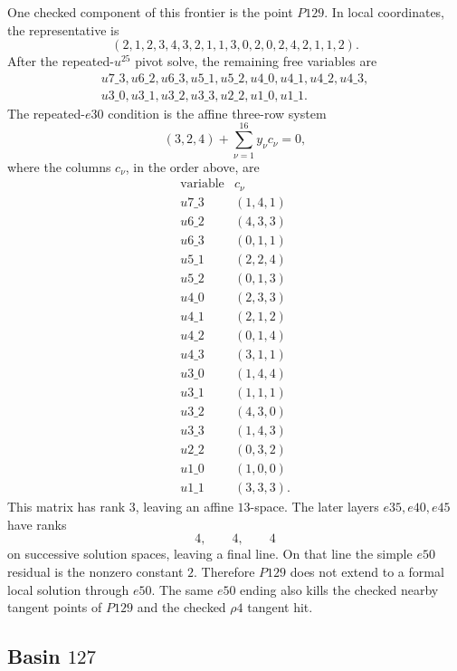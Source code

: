 \documentclass[11pt]{amsart}
\begin{document}
One checked component of this frontier is the point \(P129\).  In local
coordinates, the representative is
\[
(2,1,2,3,4,3,2,1,1,3,0,2,0,2,4,2,1,1,2).
\]
After the repeated-\(u^{25}\) pivot solve, the remaining free variables are
\[
\begin{gathered}
u7\_3,u6\_2,u6\_3,u5\_1,u5\_2,u4\_0,u4\_1,u4\_2,u4\_3,\\
u3\_0,u3\_1,u3\_2,u3\_3,u2\_2,u1\_0,u1\_1 .
\end{gathered}
\]
The repeated-\(e30\) condition is the affine three-row system
\[
  (3,2,4)+\sum_{\nu=1}^{16}y_\nu c_\nu=0,
\]
where the columns \(c_\nu\), in the order above, are
\[
\begin{array}{c|c}
\text{variable}&c_\nu\\ \hline
u7\_3&(1,4,1)\\
u6\_2&(4,3,3)\\
u6\_3&(0,1,1)\\
u5\_1&(2,2,4)\\
u5\_2&(0,1,3)\\
u4\_0&(2,3,3)\\
u4\_1&(2,1,2)\\
u4\_2&(0,1,4)\\
u4\_3&(3,1,1)\\
u3\_0&(1,4,4)\\
u3\_1&(1,1,1)\\
u3\_2&(4,3,0)\\
u3\_3&(1,4,3)\\
u2\_2&(0,3,2)\\
u1\_0&(1,0,0)\\
u1\_1&(3,3,3).
\end{array}
\]
This matrix has rank \(3\), leaving an affine \(13\)-space.  The later
layers \(e35,e40,e45\) have ranks
\[
  4,\qquad 4,\qquad 4
\]
on successive solution spaces, leaving a final line.  On that line the simple
\(e50\) residual is the nonzero constant \(2\).  Therefore \(P129\) does not
extend to a formal local solution through \(e50\).  The same \(e50\) ending
also kills the checked nearby tangent points of \(P129\) and the checked
\(\rho4\) tangent hit.

\subsection{Basin \(127\)}
\end{document}
